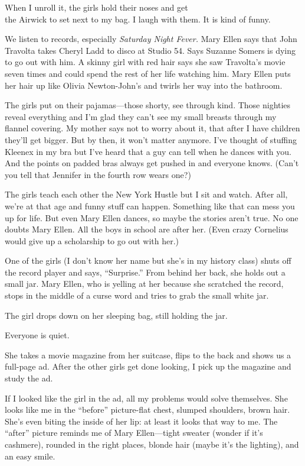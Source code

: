 \documentclass[twoside,10pt]{book}
\begin{document}
When I unroll it, the girls hold their noses and get\\
the Airwick to set next to my bag. I laugh with them. It is kind of
funny.

We listen to records, especially \emph{Saturday Night Fever.} Mary Ellen
says that John Travolta takes Cheryl Ladd to disco at Studio 54. Says
Suzanne Somers is dying to go out with him. A skinny girl with red hair
says she saw Travolta's movie seven times and could spend the rest of
her life watch­ing him. Mary Ellen puts her hair up like Olivia
Newton-John's and twirls her way into the bathroom.

The girls put on their pajamas---those shorty, see through kind. Those
nighties reveal everything and I'm glad they can't see my small breasts
through my flannel covering. My mother says not to worry about it, that
after I have children they'll get bigger. But by then, it won't matter
anymore. I've thought of stuffing Kleenex in my bra but I've heard that
a guy can tell when he dances with you. And the points on padded bras
always get pushed in and everyone knows. (Can't you tell that Jennifer
in the fourth row wears one?)

The girls teach each other the New York Hustle but I sit and watch.
After all, we're at that age and funny stuff can happen. Something like
that can mess you up for life. But even Mary Ellen dances, so maybe the
stories aren't true. No one doubts Mary Ellen. All the boys in school
are after her. (Even crazy Cornelius would give up a scholarship to go
out with her.)

One of the girls (I don't know her name but she's in my history class)
shuts off the record player and says, ``Surprise.'' From behind her
back, she holds out a small jar. Mary Ellen, who is yell­ing at her
because she scratched the record, stops in the middle of a curse word
and tries to grab the small white jar.

The girl drops down on her sleeping bag, still holding the jar.

Everyone is quiet.

She takes a movie magazine from her suitcase, flips to the back and
shows us a full-page ad. After the other girls get done looking, I pick
up the magazine and study the ad.

If I looked like the girl in the ad, all my problems would solve
themselves. She looks like me in the ``before'' picture-flat chest,
slumped shoulders, brown hair. She's even biting the inside of her lip:
at least it looks that way to me. The ``after'' picture reminds me of
Mary Ellen---tight sweater (wonder if it's cashmere), rounded in the
\clearpage
right places, blonde hair (maybe it's the lighting), and an easy smile.
\end{document}
